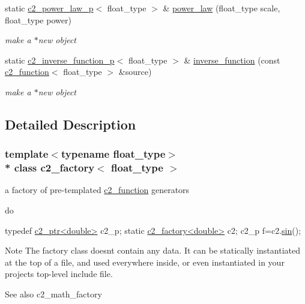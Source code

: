 \begin{DoxyCompactItemize}
static \hyperlink{classc2__power__law__p}{c2\+\_\+power\+\_\+law\+\_\+p}$<$ float\+\_\+type $>$ \& \hyperlink{classc2__factory_a2eb1ea80cc3c77555b519108cc0fad6b}{power\+\_\+law} (float\+\_\+type scale, float\+\_\+type power)
\begin{DoxyCompactList}\small\item\em make a $\ast$new object \end{DoxyCompactList}\item 
static \hyperlink{classc2__inverse__function__p}{c2\+\_\+inverse\+\_\+function\+\_\+p}$<$ float\+\_\+type $>$ \& \hyperlink{classc2__factory_aecac3e5856e36ea582da455f1b94c4d7}{inverse\+\_\+function} (const \hyperlink{classc2__function}{c2\+\_\+function}$<$ float\+\_\+type $>$ \&source)
\begin{DoxyCompactList}\small\item\em make a $\ast$new object \end{DoxyCompactList}\end{DoxyCompactItemize}


\subsection{Detailed Description}
\subsubsection*{template$<$typename float\+\_\+type$>$\\*
class c2\+\_\+factory$<$ float\+\_\+type $>$}

a factory of pre-\/templated \hyperlink{classc2__function}{c2\+\_\+function} generators 

do
\begin{DoxyCode}
\textcolor{keyword}{typedef} \hyperlink{classc2__ptr}{c2\_ptr<double>} c2\_p;
\textcolor{keyword}{static} \hyperlink{classc2__factory}{c2\_factory<double>} c2;
c2\_p f=c2.\hyperlink{classc2__factory_a866854d4fdd6c6678512151dbcd635a5}{sin}();
\end{DoxyCode}
 \begin{DoxyNote}{Note}
The factory class doesn\textquotesingle{}t contain any data. It can be statically instantiated at the top of a file, and used everywhere inside, or even instantiated in your project\textquotesingle{}s top-\/level include file. 
\end{DoxyNote}
\begin{DoxySeeAlso}{See also}
c2\+\_\+math\+\_\+factory 
\end{DoxySeeAlso}


